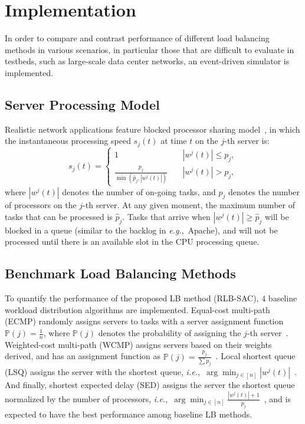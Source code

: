 \documentclass{article}
\newcommand{\ie}{\textit{i.e.},\ }
\newcommand{\eg}{\textit{e.g.},\ }
\begin{document}
\section{Implementation}

In order to compare and contrast performance of different load balancing methods in various scenarios, in particular those that are difficult to evaluate in testbeds, such as large-scale data center networks, an event-driven simulator is implemented.

\subsection{Server Processing Model}
\label{sec:implement-simulator-server}

Realistic network applications feature blocked processor sharing model~\cite{hadoop2011apache, spark2018apache}, in which the instantaneous processing speed $s_j(t)$ at time $t$ on the $j$-th server is:
\begin{equation}
	 s_j(t)=
	\begin{cases}
	1       & \quad |w^{j}(t)| \leq p_{j},\\
	\frac{p_{j}}{\min \left(\hat{p}_{j}, |w^{j}(t)|\right)}  & \quad |w^{j}(t)| > {p}_{j},
	\end{cases}
\end{equation}
where $|w^{j}(t)|$ denotes the number of on-going tasks, and $p_j$ denotes the number of processors on the $j$-th server.
At any given moment, the maximum number of tasks that can be processed is $\hat{p}_j$.
Tasks that arrive when $|w^{j}(t)| \geq \hat{p}_j$ will be blocked in a queue (similar to the backlog in \eg Apache), and will not be processed until there is an available slot in the CPU processing queue.


\subsection{Benchmark Load Balancing Methods}
\label{sec:simulator-methods}

To quantify the performance of the proposed LB method (RLB-SAC), $4$ baseline workload distribution algorithms are implemented.
Equal-cost multi-path (ECMP) randomly assigns servers to tasks with a server assignment function $\mathbb{P}(j) = \frac{1}{n}$, where $\mathbb{P}(j)$ denotes the probability of assigning the $j$-th server~\cite{faild2018}.
Weighted-cost multi-path (WCMP) assigns servers based on their weights derived, and has an assignment function as $\mathbb{P}(j) = \frac{p_j}{\sum p_j}$~\cite{maglev}.
Local shortest queue (LSQ) assigns the server with the shortest queue, \ie $\arg \min_{j\in[n]} |w^j(t)|$~\cite{twf2020}.
And finally, shortest expected delay (SED) assigns the server the shortest queue normalized by the number of processors, \ie $\arg \min_{j\in[n]} \frac{|w^j(t)|+1}{p_j}$~\cite{lvs}, and is expected to have the best performance among baseline LB methods.
\end{document}
